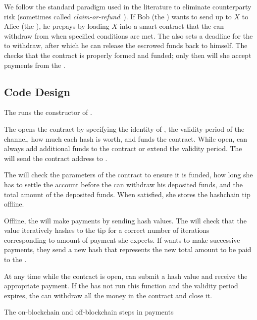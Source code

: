 We follow the standard paradigm used in the literature to eliminate counterparty risk (sometimes called \textit{claim-or-refund}~\cite{BK14}). If Bob (the \make) wants to send up to $X$ \eth to Alice (the \take), he prepays by loading $X$ \eth into a smart contract that the \take can withdraw from when specified conditions are met. The \make also sets a deadline for the \take to withdraw, after which he can release the escrowed funds back to himself. The \take checks that the contract is properly formed and funded; only then will she accept payments from the \make.

\subsection{Code Design}

\begin{Protocol*}[t!] \begin{framed} \footnotesize
\begin{compactlistn}
\item The \make runs the constructor of \ew.
\item The \make opens the contract by specifying the identity of \take, the validity period of the channel, how much each hash is worth, and funds the contract. While open, \make can always add additional funds to the contract or extend the validity period. The \make will send the contract address to \take. 
\item The \take will check the parameters of the contract to ensure it is funded, how long she has to settle the account before the \make can withdraw his deposited funds, and the total amount of the deposited funds. When satisfied, she stores the hashchain tip offline.
\item Offline, the \make will make payments by sending hash values. The \take will check that the value iteratively hashes to the tip for a correct number of iterations corresponding to amount of payment she expects. If \make wants to make successive payments, they send a new hash that represents the new total amount to be paid to the \take.
\item At any time while the contract is open, \take can submit a hash value and receive the appropriate payment. If the \take has not run this function and the validity period expires, the \make can withdraw all the money in the contract and close it. 
\end{compactlistn}
\normalsize \end{framed}
\caption{The on-blockchain and off-blockchain steps in \ew payments~\label{alg:lab}}
\end{Protocol*}

